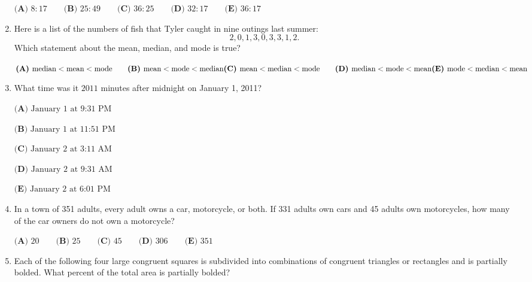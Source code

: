 \documentclass{article}
\begin{document}
\begin{enumerate}[label=\arabic*., itemsep=0.5em]
\( \textbf{(A) }8:17 \qquad\textbf{(B) }25:49 \qquad\textbf{(C) }36:25 \qquad\textbf{(D) }32:17 \qquad\textbf{(E) }36:17\)\par \vspace{0.5em}\item Here is a list of the numbers of fish that Tyler caught in nine outings last summer: 
\begin{equation*}
2,0,1,3,0,3,3,1,2.
\end{equation*}
 Which statement about the mean, median, and mode is true?

\(\textbf{(A) }\text{median} < \text{mean} < \text{mode} \qquad \textbf{(B) }\text{mean} < \text{mode} < \text{median} \\ \\ \textbf{(C) }\text{mean} < \text{median} < \text{mode} \qquad \textbf{(D) }\text{median} < \text{mode} < \text{mean} \\ \\ \textbf{(E) }\text{mode} < \text{median} < \text{mean}\)\par \vspace{0.5em}\item What time was it \(2011\) minutes after midnight on January 1, 2011?

\(\textbf{(A) }\text{January 1 at 9:31 PM}\)

\(\textbf{(B) }\text{January 1 at 11:51 PM}\) 

\(\textbf{(C) }\text{January 2 at 3:11 AM}\) 

\(\textbf{(D) }\text{January 2 at 9:31 AM}\) 

\(\textbf{(E) }\text{January 2 at 6:01 PM}\)\par \vspace{0.5em}\item In a town of 351 adults, every adult owns a car, motorcycle, or both. If 331 adults own cars and 45 adults own motorcycles, how many of the car owners do not own a motorcycle?

\( \textbf{(A) }20 \qquad\textbf{(B) }25 \qquad\textbf{(C) }45 \qquad\textbf{(D) }306 \qquad\textbf{(E) }351\)\par \vspace{0.5em}\item Each of the following four large congruent squares is subdivided into combinations of congruent triangles or rectangles and is partially bolded. What percent of the total area is partially bolded?



\end{enumerate}
\end{document}
